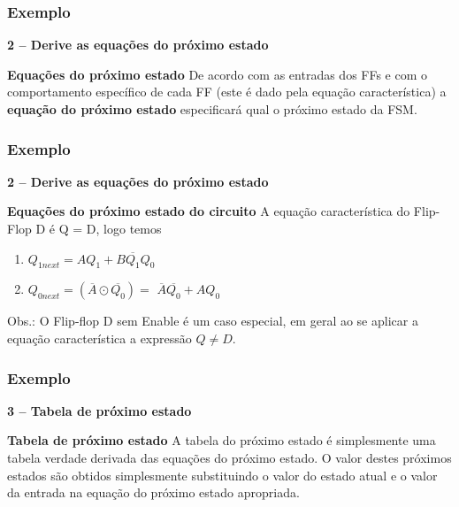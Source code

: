 \documentclass{beamer}
\begin{document}
\begin{frame}
  \frametitle{Exemplo}
  \textbf{2 – Derive as equações do próximo estado}
  \begin{block}{\textbf{Equações do próximo estado}}
    De acordo com as entradas dos FFs e com o comportamento específico de cada 
    FF (este é dado pela equação característica) a \textbf{equação do próximo 
    estado} especificará qual o próximo estado da FSM.
  \end{block}
\end{frame}

\begin{frame}
  \frametitle{Exemplo}
  \textbf{2 – Derive as equações do próximo estado}
  \begin{block}{\textbf{Equações do próximo estado do circuito}}
    A equação característica do Flip-Flop D é Q = D, logo temos
    \begin{enumerate}
     \item $ Q_{1next} = AQ_1 + B\overline{Q_1}Q_0 $
     \item $ Q_{0next} = (\overline{A}\odot\overline{Q_0}) = $
        $\overline{A}\overline{Q_0} + AQ_0 $
    \end{enumerate}
  \end{block}\pause
  Obs.: O Flip-flop D sem Enable é um caso especial, em geral ao se aplicar a 
    equação característica a expressão $ Q \neq D $.
\end{frame}

\begin{frame}
  \frametitle{Exemplo}
  \textbf{3 – Tabela de próximo estado}
  \begin{block}{\textbf{Tabela de próximo estado}}
    A tabela do próximo estado é simplesmente uma tabela verdade derivada das 
    equações do próximo estado. O valor destes próximos estados são obtidos 
    simplesmente substituindo o valor do estado atual e o valor da entrada na 
    equação do próximo estado apropriada. 
  \end{block}
\end{frame}
\end{document}
